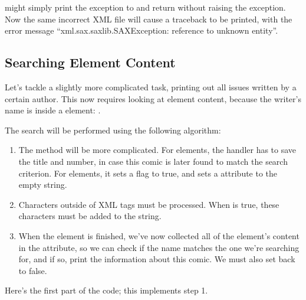 \documentclass{howto}
\newcommand{\element}[1]{\code{#1}}
\begin{document}
 might simply print the exception to  
and return without raising the exception.  Now the same incorrect XML
file will cause a traceback to be printed, with the error message
``xml.sax.saxlib.SAXException: reference to unknown entity''.  

\subsection{Searching Element Content}

Let's tackle a slightly more complicated task, printing out all issues
written by a certain author.  This now requires looking at element
content, because the writer's name is inside a \element{writer}
element: .

The search will be performed using the following algorithm:

\begin{enumerate}
\item 
The  method will be more complicated.  For
\element{comic} elements, the handler has to save the title and
number, in case this comic is later found to match the search
criterion.  For \element{writer} elements, it sets a
 flag to true, and sets a 
attribute to the empty string.

\item Characters outside of XML tags must be processed.  When
 is true, these characters must be added to the
 string.

\item When the \element{writer} element is finished, we've now
collected all of the element's content in the 
attribute, so we can check if the name matches the one we're searching 
for, and if so, print the information about this comic.  We must also
set  back to false.
\end{enumerate}

Here's the first part of the code; this implements step 1.
\end{document}
